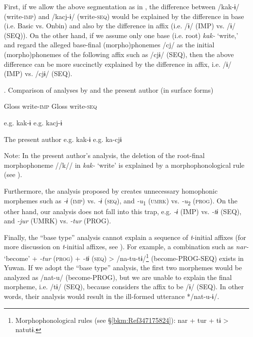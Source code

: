 First, if we allow the above segmentation as in , the difference between /kak-ɨ/ (write-\textsc{imp}) and /kacj-ɨ/ (write-\textsc{seq}) would be explained by the difference in base (i.e. Basic vs. Onbin) and also by the difference in affix (i.e. /ɨ/ (IMP) vs. /ɨ/ (SEQ)). On the other hand, if we assume only one base (i.e. root) \textit{kak-} ‘write,’ and regard the alleged base-final (morpho)phonemes /cj/ as the initial (morpho)phonemes of the following affix such as /cjɨ/ (SEQ), then the above difference can be more succinctly explained by the difference in affix, i.e. /ɨ/ (IMP) vs. /cjɨ/ (SEQ).

\begin{styleBeschriftung}
\textmd{. Comparison of analyses by \citet{UchimaEtAl1976} and the present author (in surface forms)}
\end{styleBeschriftung}

  Gloss  write-\textsc{imp}    Gloss  write-\textsc{seq}

\citet{UchimaEtAl1976}  e.g.  kak-ɨ    e.g.  kacj-ɨ

The present author  e.g.  kak-ɨ    e.g.  ka-cjɨ

Note: In the present author’s analysis, the deletion of the root-final morphophoneme //k// in \textit{kak-} ‘write’ is explained by a morphophonological rule (see ).

  Furthermore, the analysis proposed by \citet{UchimaEtAl1976} creates unnecessary homophonic morphemes such as \textit{{}-ɨ} (\textsc{imp}) vs. \textit{{}-ɨ} (\textsc{seq}), and \textit{{}-u}\textsubscript{1} (\textsc{umrk}) vs. \textit{{}-u}\textsubscript{2} (\textsc{prog}). On the other hand, our analysis does not fall into this trap, e.g. \textit{{}-ɨ} (IMP) vs. \textit{{}-tɨ} (SEQ), and \textit{{}-jur} (UMRK) vs. \textit{{}-tur} (PROG).

  Finally, the “base type” analysis cannot explain a sequence of \textit{t}{}-initial affixes (for more discussion on \textit{t}{}-initial affixes, see ). For example, a combination such as \textit{nar-} ‘become’ + \textit{-tur} (\textsc{prog}) + \textit{{}-tɨ} (\textsc{seq}) > /na-tu-tɨ/\footnote{Morphophonological rules (see §\ref{bkm:Ref347175824}): nar + tur + tɨ > natutɨ.} (become-PROG-SEQ) exists in Yuwan. If we adopt the “base type” analysis, the first two morphemes would be analyzed as /nat-u/ (become-PROG), but we are unable to explain the final morpheme, i.e. /tɨ/ (SEQ), because \citet[91-92]{UchimaEtAl1976} considers the affix to be /ɨ/ (SEQ). In other words, their analysis would result in the ill-formed utterance */nat-u-ɨ/.

